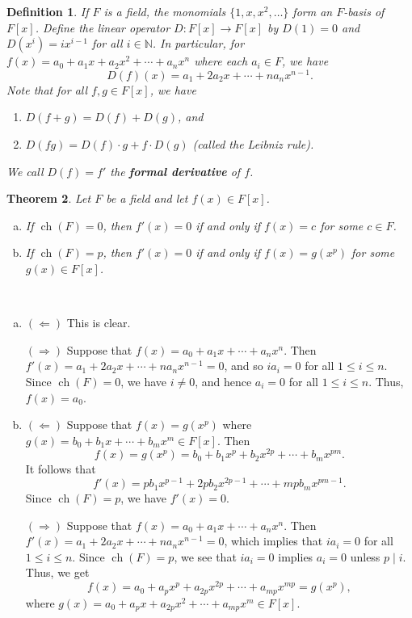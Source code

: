 \documentclass[10pt]{article}
\makeatletter
\newcommand{\N}{\mathbb{N}}
\DeclareMathOperator{\ch}{ch}
\theoremstyle{newstyle}
\newtheorem{thm}{Theorem}[section]
\newtheorem{defn}[thm]{Definition}
\newenvironment{pf}[1][\proofname]{\par
  \pushQED{\qed}%
  \normalfont \topsep0\p@\relax
  \trivlist
  \item[\hskip\labelsep\scshape
  #1\@addpunct{.}]\ignorespaces
}{%
  \popQED\endtrivlist\@endpefalse
}
\makeatother
\begin{document}
\begin{defn}
If $F$ is a field, the monomials $\{1, x, x^2, \dots\}$ form an $F$-basis of $F[x]$. 
Define the linear operator $D : F[x] \to F[x]$ by $D(1) = 0$ and $D(x^i) = ix^{i-1}$ for 
all $i \in \N$. In particular, for $f(x) = a_0 + a_1x + a_2x^2 + \cdots + a_nx^n$ where 
each $a_i \in F$, we have 
\[ D(f)(x) = a_1 + 2a_2x + \cdots + na_n x^{n-1}. \]
Note that for all $f, g \in F[x]$, we have 
\begin{enumerate}[(1)]
    \item $D(f+g) = D(f) + D(g)$, and 
    \item $D(fg) = D(f) \cdot g + f \cdot D(g)$ (called the Leibniz rule).
\end{enumerate}
We call $D(f) = f'$ the {\bf formal derivative} of $f$.
\end{defn}

\begin{thm}
Let $F$ be a field and let $f(x) \in F[x]$. 
\begin{enumerate}[(a)]
    \item If $\ch(F) = 0$, then $f'(x) = 0$ if and only if $f(x) = c$ for some $c \in F$.
    \item If $\ch(F) = p$, then $f'(x) = 0$ if and only if $f(x) = g(x^p)$ for some 
    $g(x) \in F[x]$.
\end{enumerate}
\end{thm}
\begin{pf}~
\begin{enumerate}[(a)]
    \item $(\Leftarrow)$ This is clear. 
    
    $(\Rightarrow)$ Suppose that $f(x) = a_0 + a_1x + \cdots + a_nx^n$. Then 
    $f'(x) = a_1 + 2a_2x + \cdots + na_n x^{n-1} = 0$, and so $ia_i = 0$ for all 
    $1 \leq i \leq n$. Since $\ch(F) = 0$, we have $i \neq 0$, and hence $a_i = 0$ for all 
    $1 \leq i \leq n$. Thus, $f(x) = a_0$.
    
    \item $(\Leftarrow)$ Suppose that $f(x) = g(x^p)$ where $g(x) = b_0 + b_1x + \cdots + 
    b_m x^m \in F[x]$. Then 
    \[ f(x) = g(x^p) = b_0 + b_1 x^p + b_2 x^{2p} + \cdots + b_m x^{pm}. \]
    It follows that 
    \[ f'(x) = pb_1 x^{p-1} + 2pb_2 x^{2p-1} + \cdots + mpb_m x^{pm-1}. \]
    Since $\ch(F) = p$, we have $f'(x) = 0$. 
    
    $(\Rightarrow)$ Suppose that $f(x) = a_0 + a_1x + \cdots + a_n x^n$. Then 
    $f'(x) = a_1 + 2a_2x + \cdots + na_n x^{n-1} = 0$, which implies that 
    $ia_i = 0$ for all $1 \leq i \leq n$. Since $\ch(F) = p$, we see that $ia_i = 0$ implies $a_i = 0$ 
    unless $p \mid i$. Thus, we get 
    \[ f(x) = a_0 + a_p x^p + a_{2p} x^{2p} + \cdots + a_{mp} x^{mp} = g(x^p), \]
    where $g(x) = a_0 + a_p x + a_{2p} x^2 + \cdots + a_{mp} x^m \in F[x]$. \qedhere 
\end{enumerate}
\end{pf}
\end{document}
